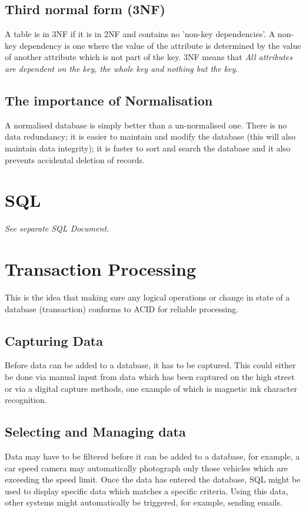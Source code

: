 \documentclass[a4paper,11pt, twocolumn]{article}
\begin{document}
\subsection{Third normal form (3NF)}
A table is in 3NF if it is in 2NF and contains no 'non-key dependencies'. A non-key dependency is one where the value of the attribute is determined by the value of another attribute which is not part of the key. 3NF means that \textit{All attributes are dependent on the key, the whole key and nothing but the key}.
\subsection{The importance of Normalisation}
A normalised database is simply better than a un-normalised one. There is no data redundancy; it is easier to maintain and modify the database (this will also maintain data integrity); it is faster to sort and search the database and it also prevents accidental deletion of records.

\section{SQL}
\textit{See separate SQL Document.}

\section{Transaction Processing}
This is the idea that making sure any logical operations or change in state of a database (transaction) conforms to ACID for reliable processing.
\subsection{Capturing Data}
Before data can be added to a database, it has to be captured. This could either be done via manual input from data which has been captured on the high street or via a digital capture methods, one example of which is magnetic ink character recognition.
\subsection{Selecting and Managing data}
Data may have to be filtered before it can be added to a database, for example, a car speed camera may automatically photograph only those vehicles which are exceeding the speed limit. Once the data has entered the database, SQL might be used to display specific data which matches a specific criteria. Using this data, other systems might automatically be triggered, for example, sending emails.
\end{document}
